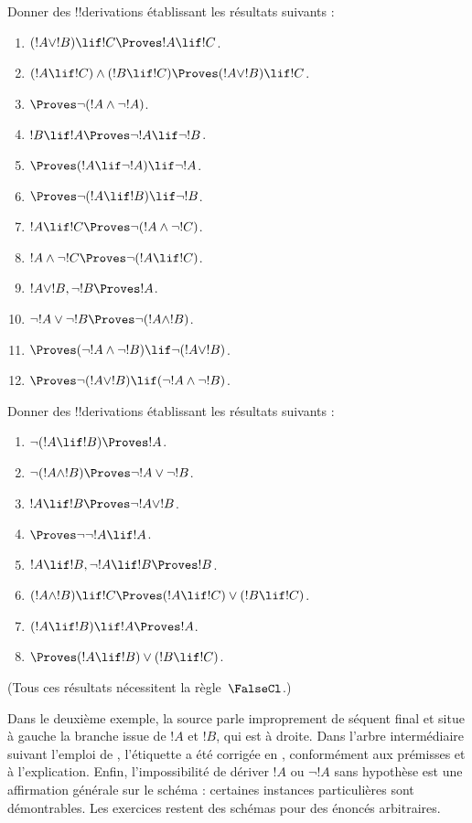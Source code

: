 \documentclass[11pt,a4paper,openany]{memoir}
\begin{document}
\begin{prob}
Donner des !!{derivation}s établissant les résultats suivants :
\begin{enumerate}
\item $(!A \lor !B) \lif !C \Proves !A \lif !C$.
\item $(!A \lif !C) \land (!B \lif !C) \Proves (!A \lor !B) \lif !C$.
\item $\Proves \lnot(!A \land \lnot !A)$.
\item $!B \lif !A \Proves \lnot !A \lif \lnot !B$.
\item $\Proves (!A \lif \lnot !A) \lif \lnot !A$.
\item $\Proves \lnot(!A \lif !B) \lif \lnot !B$.
\item $!A \lif !C \Proves \lnot (!A \land \lnot !C)$.
\item $!A \land \lnot !C \Proves \lnot (!A \lif !C)$.
\item $!A \lor !B, \lnot !B \Proves !A$.
\item $\lnot !A \lor \lnot !B \Proves \lnot(!A \land !B)$.
\item $\Proves (\lnot !A \land \lnot !B) \lif\lnot(!A \lor !B)$.
\item $\Proves \lnot(!A \lor !B) \lif (\lnot !A \land \lnot !B)$.
\end{enumerate}
\end{prob}

\begin{prob}
Donner des !!{derivation}s établissant les résultats suivants :
\begin{enumerate}
\item $\lnot(!A \lif !B) \Proves !A$.
\item $\lnot(!A \land !B) \Proves \lnot !A \lor \lnot !B$.
\item $!A \lif !B \Proves \lnot !A \lor !B$.
\item $\Proves \lnot \lnot !A \lif !A$.
\item $!A \lif !B, \lnot !A \lif !B \Proves !B$.
\item $(!A \land !B) \lif !C \Proves (!A \lif !C) \lor (!B \lif !C)$.
\item $(!A \lif !B) \lif !A \Proves !A$.
\item $\Proves (!A \lif !B) \lor (!B \lif !C)$.
\end{enumerate}
(Tous ces résultats nécessitent la règle~$\FalseCl$.)
\end{prob}

\begin{editorial}
Dans le deuxième exemple, la source parle improprement de séquent
final et situe à gauche la branche issue de $!A$ et $!B$, qui est
à droite. Dans l'arbre intermédiaire suivant l'emploi de \FalseInt,
l'étiquette \Intro{\lfalse} a été corrigée en \Elim{\lnot},
conformément aux prémisses et à l'explication. Enfin, l'impossibilité
de dériver $!A$ ou $\lnot !A$ sans hypothèse est une affirmation
générale sur le schéma : certaines instances particulières sont
démontrables. Les exercices restent des schémas pour des énoncés
arbitraires.
\end{editorial}
\end{document}
